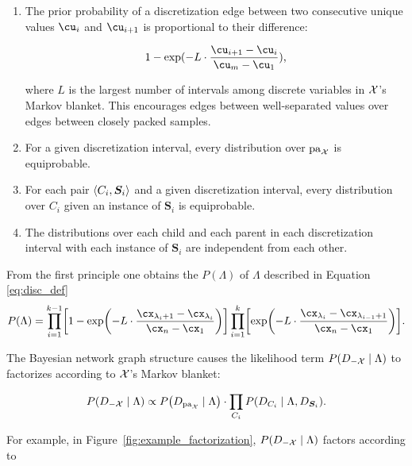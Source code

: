 \begin{enumerate}
\item The prior probability of a discretization edge between two consecutive unique values $\cu_i$ and $\cu_{i+1}$ is proportional to their difference:

  \begin{equation}
  1 - {\exp(- L \cdot {\frac{\cu_{i+1} - \cu_i}{\cu_m - \cu_1}})}\text{,}
  \end{equation}

where $L$ is the largest number of intervals among discrete variables in $\mathcal{X}$'s Markov blanket.
This encourages edges between well-separated values over edges between closely packed samples.

\item For a given discretization interval, every distribution over $\operatorname{pa}_{\mathcal{X}}$ is equiprobable.
\item For each pair $\langle C_i,\bm{S}_i \rangle$ and a given discretization interval, every distribution over $C_i$ given an instance of $\bm{S}_i$ is equiprobable.
\item The distributions over each child and each parent in each discretization interval with each instance of $\bm{S}_i$ are independent from each other.
\end{enumerate}

From the first principle one obtains the $P(\Lambda)$ of $\Lambda$ described in Equation \ref{eq:disc_def}
\begin{equation}
  \label{eq:p_M}
  P(\Lambda) = \prod_{i=1}^{k-1}
    \brock{
      1 - \exp\paren{
        - L \cdot \frac{
                         \cx_{\lambda_i +1} - \cx_{\lambda_i}
                       }{
                         \cx_n - \cx_1
                        }
      }
    }     
    \prod_{i=1}^{k}
	\brock{    
    \exp\paren{
      -L \cdot \frac{\cx_{\lambda_{i}} - \cx_{\lambda_{i-1} + 1}}{\cx_n - \cx_1}}
    }\text{.}
\end{equation}

The Bayesian network graph structure causes the likelihood term $P(D_{-\mathcal{X}} \mid \Lambda)$ to factorizes according to $\mathcal{X}$'s Markov blanket:

\begin{equation}
  \label{eq:p_D_given_M}
  P\paren{D_{-\cX} \mid \Lambda} \propto P\paren{D_{\Pa_\cX} \mid \Lambda} \cdot \prod_{C_i} P\paren{D_{C_i} \mid \Lambda, D_{\bm{S}_i}}\text{.}
\end{equation}

For example, in Figure~\ref{fig:example_factorization}, $P(D_{-\mathcal{X}} \mid \Lambda)$ factors according to

